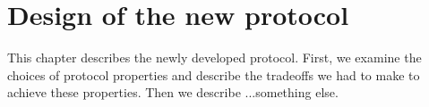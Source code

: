 
\chapter{Design of the new protocol}

This chapter describes the newly developed protocol. First, we examine the choices of protocol properties and
describe the tradeoffs we had to make to achieve these properties. Then we describe ...something else.
